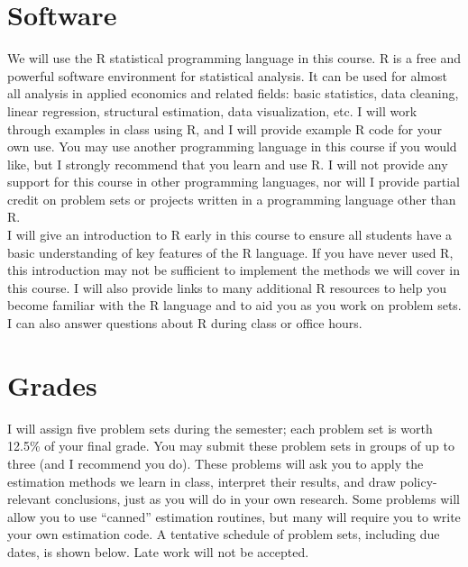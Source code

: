 \documentclass[11pt,letterpaper]{article}
\begin{document}
\section*{Software}

We will use the R statistical programming language in this course. R is a free and powerful software environment for statistical analysis. It can be used for almost all analysis in applied economics and related fields: basic statistics, data cleaning, linear regression, structural estimation, data visualization, etc. I will work through examples in class using R, and I will provide example R code for your own use. You may use another programming language in this course if you would like, but I strongly recommend that you learn and use R. I will not provide any support for this course in other programming languages, nor will I provide partial credit on problem sets or projects written in a programming language other than R. \\

\noindent I will give an introduction to R early in this course to ensure all students have a basic understanding of key features of the R language. If you have never used R, this introduction may not be sufficient to implement the methods we will cover in this course. I will also provide links to many additional R resources to help you become familiar with the R language and to aid you as you work on problem sets. I can also answer questions about R during class or office hours.

\section*{Grades}

I will assign five problem sets during the semester; each problem set is worth 12.5\% of your final grade. You may submit these problem sets in groups of up to three (and I recommend you do). These problems will ask you to apply the estimation methods we learn in class, interpret their results, and draw policy-relevant conclusions, just as you will do in your own research. Some problems will allow you to use ``canned'' estimation routines, but many will require you to write your own estimation code. A tentative schedule of problem sets, including due dates, is shown below. Late work will not be accepted. \\
\end{document}
